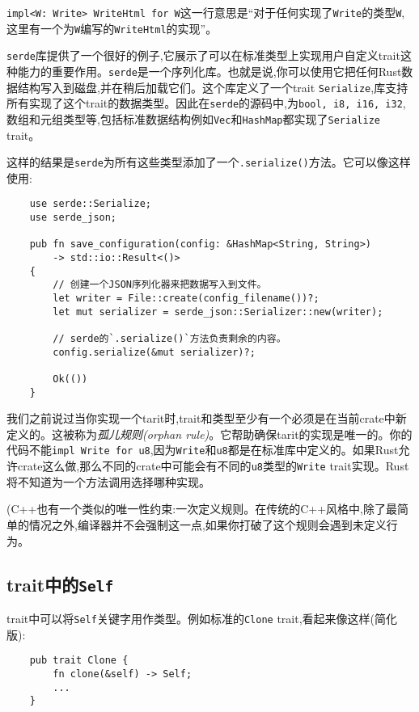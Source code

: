 \texttt{impl<W: Write> WriteHtml for W}这一行意思是“对于任何实现了\texttt{Write}的类型\texttt{W},这里有一个为\texttt{W}编写的\texttt{WriteHtml}的实现”。

\texttt{serde}库提供了一个很好的例子,它展示了可以在标准类型上实现用户自定义trait这种能力的重要作用。\texttt{serde}是一个序列化库。也就是说,你可以使用它把任何Rust数据结构写入到磁盘,并在稍后加载它们。这个库定义了一个trait \texttt{Serialize},库支持所有实现了这个trait的数据类型。因此在\texttt{serde}的源码中,为\texttt{bool, i8, i16, i32},数组和元组类型等,包括标准数据结构例如\texttt{Vec}和\texttt{HashMap}都实现了\texttt{Serialize} trait。

这样的结果是\texttt{serde}为所有这些类型添加了一个\texttt{.serialize()}方法。它可以像这样使用:
\begin{verbatim}
    use serde::Serialize;
    use serde_json;

    pub fn save_configuration(config: &HashMap<String, String>) 
        -> std::io::Result<()>
    {
        // 创建一个JSON序列化器来把数据写入到文件。
        let writer = File::create(config_filename())?;
        let mut serializer = serde_json::Serializer::new(writer);

        // serde的`.serialize()`方法负责剩余的内容。
        config.serialize(&mut serializer)?;

        Ok(())
    }
\end{verbatim}

我们之前说过当你实现一个tarit时,trait和类型至少有一个必须是在当前crate中新定义的。这被称为\emph{孤儿规则(orphan rule)}。它帮助确保tarit的实现是唯一的。你的代码不能\texttt{impl Write for u8},因为\texttt{Write}和\texttt{u8}都是在标准库中定义的。如果Rust允许crate这么做,那么不同的crate中可能会有不同的\texttt{u8}类型的\texttt{Write} trait实现。Rust将不知道为一个方法调用选择哪种实现。

(C++也有一个类似的唯一性约束:一次定义规则。在传统的C++风格中,除了最简单的情况之外,编译器并不会强制这一点,如果你打破了这个规则会遇到未定义行为。

\subsection{trait中的\texttt{Self}}
trait中可以将\texttt{Self}关键字用作类型。例如标准的\texttt{Clone} trait,看起来像这样(简化版):
\begin{verbatim}
    pub trait Clone {
        fn clone(&self) -> Self;
        ...
    }
\end{verbatim}

